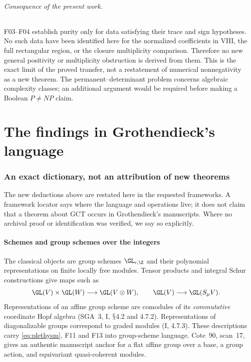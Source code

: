 \documentclass[11pt,a4paper]{article}
\renewcommand{\S}{\ensuremath{\mathsection}}
\newcommand{\fid}[1]{\textsf{#1}}\newcommand{\gate}[1]{\textsf{#1}}
\theoremstyle{named}\newtheorem{finding}{Finding}[section]
\theoremstyle{definition}\newtheorem{definition}[finding]{Definition}
\theoremstyle{remark}\newtheorem{remark}[finding]{Remark}
\begin{document}
\paragraph{Consequence of the present work.}
\fid{F03}--\fid{F04} establish purity only for data satisfying their trace and sign hypotheses. No such data have been identified here for the normalized coefficients in VIII, the full rectangular region, or the closure multiplicity comparison. Therefore no new general positivity or multiplicity obstruction is derived from them. This is the exact limit of the proved transfer, not a restatement of numerical nonnegativity as a new theorem. The permanent--determinant problem concerns algebraic complexity classes; an additional argument would be required before making a Boolean $P\ne NP$ claim.

\part{The findings in Grothendieck's language}
\section{An exact dictionary, not an attribution of new theorems}\label{sec:groth}
The new deductions above are restated here in the requested frameworks. A framework locator says where the language and operations live; it does not claim that a theorem about GCT occurs in Grothendieck's manuscripts. Where no archival proof or identification was verified, we say so explicitly.

\subsection{Schemes and group schemes over the integers}
The classical objects are group schemes $\GL_{r,\Z}$ and their polynomial representations on finite locally free modules. Tensor products and integral Schur constructions give maps such as
\[
 \GL(V)\times\GL(W)\longrightarrow\GL(V\otimes W),\qquad
 \GL(V)\longrightarrow\GL(S_\mu V).
\]
Representations of an affine group scheme are comodules of its \emph{commutative} coordinate Hopf algebra (SGA~3, I, \S4.2 and 4.7.2). Representations of diagonalizable groups correspond to graded modules (I, 4.7.3). These descriptions carry \eqref{eq:plethysm}, \fid{F11} and \fid{F13} into group-scheme language. Cote~90, scan~17, gives an authentic manuscript anchor for a flat affine group over a base, a group action, and equivariant quasi-coherent modules.
\end{document}
